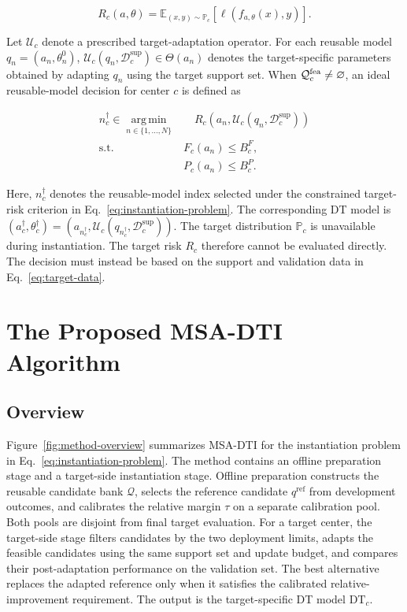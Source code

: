 \documentclass[a4paper,fleqn]{cas-sc}
\begin{document}
\begin{equation}
R_c(a,\theta)
=
\mathbb{E}_{(x,y)\sim\mathbb{P}_c}
\left[
\ell(f_{a,\theta}(x),y)
\right].
\label{eq:target-risk}
\end{equation}

Let $\mathcal{U}_c$ denote a prescribed target-adaptation operator. For each
reusable model $q_n=(a_n,\theta_n^0)$,
$\mathcal{U}_c(q_n,\mathcal{D}_c^{\mathrm{sup}})\in\Theta(a_n)$ denotes
the target-specific parameters obtained by adapting $q_n$ using the target
support set. When $\mathcal Q_c^{\rm fea}\ne\varnothing$, an ideal
reusable-model decision for center $c$ is defined as

\begin{equation}
\begin{aligned}
n_c^\dagger
\in
\operatorname*{arg\,min}_{n\in\{1,\ldots,N\}}
&\quad
R_c\!\left(
a_n,
\mathcal{U}_c(q_n,\mathcal{D}_c^{\mathrm{sup}})
\right)
\\
\mathrm{s.t.}\quad
&F_c(a_n)\leq B_c^F,
\\
&P_c(a_n)\leq B_c^P.
\end{aligned}
\label{eq:instantiation-problem}
\end{equation}

Here, $n_c^\dagger$ denotes the reusable-model index selected under the
constrained target-risk criterion in Eq.~\eqref{eq:instantiation-problem}. The
corresponding DT model is
$\left(a_c^\dagger,\theta_c^\dagger\right)
=
\left(
a_{n_c^\dagger},
\mathcal{U}_c(q_{n_c^\dagger},\mathcal{D}_c^{\mathrm{sup}})
\right)$.
The target distribution $\mathbb{P}_c$ is unavailable during instantiation.
The target risk $R_c$ therefore cannot be evaluated directly. The decision
must instead be based on the support and validation data in
Eq.~\eqref{eq:target-data}.

\section{The Proposed MSA-DTI Algorithm}
\label{sec:method}

\subsection{Overview}

Figure~\ref{fig:method-overview} summarizes MSA-DTI for the instantiation
problem in Eq.~\eqref{eq:instantiation-problem}. The method contains an offline
preparation stage and a target-side instantiation stage. Offline preparation
constructs the reusable candidate bank $\mathcal{Q}$, selects the reference
candidate $q^{\mathrm{ref}}$ from development outcomes, and calibrates the
relative margin $\tau$ on a separate calibration pool. Both pools are
disjoint from final target evaluation. For a target
center, the target-side stage filters candidates by the two deployment limits,
adapts the feasible candidates using the same support set and update budget,
and compares their post-adaptation performance on the validation set. The best
alternative replaces the adapted reference only when it satisfies the
calibrated relative-improvement requirement. The output is the target-specific
DT model $\mathrm{DT}_c$.
\end{document}
